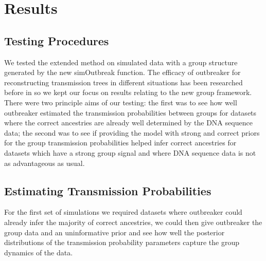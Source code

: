 \documentclass[11pt,a4paper]{report}
\begin{document}
\chapter{Results}
\section{Testing Procedures}
We tested the extended method on simulated data with a group structure generated by the new simOutbreak function. The efficacy of outbreaker for reconstructing transmission trees in different situations has been researched before in \citet{outbrkr} so we kept our focus on results relating to the new group framework. There were two principle aims of our testing: the first was to see how well outbreaker estimated the transmission probabilities between groups for datasets where the correct ancestries are already well determined by the DNA sequence data; the second was to see if providing the model with strong and correct priors for the group transmission probabilities helped infer correct ancestries for datasets which have a strong group signal and where DNA sequence data is not as advantageous as usual. 

\section{Estimating Transmission Probabilities}

For the first set of simulations we required datasets where outbreaker could already infer the majority of correct ancestries, we could then give outbreaker the group data and an uninformative prior and see how well the posterior distributions of the transmission probability parameters capture the group dynamics of the data.
\end{document}
